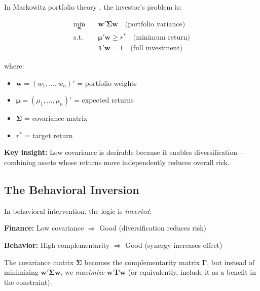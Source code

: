 In Markowitz portfolio theory \citep{markowitz1952}, the investor's problem is:

\begin{equation}
\begin{aligned}
\min_{\mathbf{w}} \quad & \mathbf{w}'\boldsymbol{\Sigma}\mathbf{w} \quad \text{(portfolio variance)} \\
\text{s.t.} \quad & \boldsymbol{\mu}'\mathbf{w} \geq r^* \quad \text{(minimum return)} \\
& \mathbf{1}'\mathbf{w} = 1 \quad \text{(full investment)}
\end{aligned}
\label{eq:markowitz}
\end{equation}

where:
\begin{itemize}[nosep]
\item $\mathbf{w} = (w_1, \ldots, w_n)'$ = portfolio weights
\item $\boldsymbol{\mu} = (\mu_1, \ldots, \mu_n)'$ = expected returns
\item $\boldsymbol{\Sigma}$ = covariance matrix
\item $r^*$ = target return
\end{itemize}

\textbf{Key insight:} Low covariance is desirable because it enables diversification---
combining assets whose returns move independently reduces overall risk.

\subsection{The Behavioral Inversion}

In behavioral intervention, the logic is \textit{inverted}:

\begin{tcolorbox}[colback=yellow!5!white, colframe=yellow!75!black,
    title=The Key Inversion]

\textbf{Finance:} Low covariance $\Rightarrow$ Good (diversification reduces risk)

\textbf{Behavior:} High complementarity $\Rightarrow$ Good (synergy increases effect)

\vspace{0.5em}
The covariance matrix $\boldsymbol{\Sigma}$ becomes the complementarity matrix
$\boldsymbol{\Gamma}$, but instead of minimizing $\mathbf{w}'\boldsymbol{\Sigma}\mathbf{w}$,
we \textit{maximize} $\mathbf{w}'\boldsymbol{\Gamma}\mathbf{w}$ (or equivalently,
include it as a benefit in the constraint).
\end{tcolorbox}

